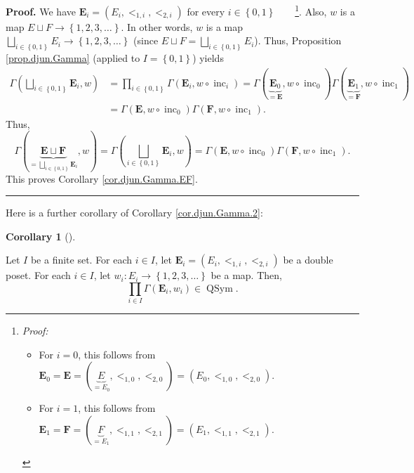 \documentclass[numbers=enddot,12pt,final,onecolumn,notitlepage,abstracton]{scrartcl}
\theoremstyle{definition}
\newtheorem{coro}[theo]{Corollary}
\newenvironment{corollary}[1][]
{\begin{coro}[#1]\begin{leftbar}}
{\end{leftbar}\end{coro}}
\newenvironment{proof}[1][Proof]{\noindent\textbf{#1.} }{\ \rule{0.5em}{0.5em}}
\let\prodnonlimits\prod
\renewcommand{\prod}{\prodnonlimits\limits}
\newenvironment{verlong}{}{}
\begin{document}
\begin{verlong}
\begin{footnotesize}
\begin{proof}
We have $\mathbf{E}_{i}=\left(  E_{i},<_{1,i},<_{2,i}\right)  $ for every
$i\in\left\{  0,1\right\}  $\ \ \ \ \footnote{\textit{Proof:}
\par
\begin{itemize}
\item For $i=0$, this follows from $\mathbf{E}_{0}=\mathbf{E}=\left(
\underbrace{E}_{=E_{0}},<_{1,0},<_{2,0}\right)  =\left(  E_{0},<_{1,0}%
,<_{2,0}\right)  $.
\par
\item For $i=1$, this follows from $\mathbf{E}_{1}=\mathbf{F}=\left(
\underbrace{F}_{=E_{1}},<_{1,1},<_{2,1}\right)  =\left(  E_{1},<_{1,1}%
,<_{2,1}\right)  $.
\end{itemize}
}. Also, $w$ is a map $E\sqcup F\rightarrow\left\{  1,2,3,\ldots\right\}  $.
In other words, $w$ is a map $\bigsqcup_{i\in\left\{  0,1\right\}  }%
E_{i}\rightarrow\left\{  1,2,3,\ldots\right\}  $ (since $E\sqcup
F=\bigsqcup_{i\in\left\{  0,1\right\}  }E_{i}$). Thus, Proposition
\ref{prop.djun.Gamma} (applied to $I=\left\{  0,1\right\}  $) yields%
\begin{align*}
\Gamma\left(  \bigsqcup_{i\in\left\{  0,1\right\}  }\mathbf{E}_{i},w\right)
&  =\prod_{i\in\left\{  0,1\right\}  }\Gamma\left(  \mathbf{E}_{i}%
,w\circ\operatorname*{inc}\nolimits_{i}\right)  =\Gamma\left(
\underbrace{\mathbf{E}_{0}}_{=\mathbf{E}},w\circ\operatorname*{inc}%
\nolimits_{0}\right)  \Gamma\left(  \underbrace{\mathbf{E}_{1}}_{=\mathbf{F}%
},w\circ\operatorname*{inc}\nolimits_{1}\right) \\
&  =\Gamma\left(  \mathbf{E},w\circ\operatorname*{inc}\nolimits_{0}\right)
\Gamma\left(  \mathbf{F},w\circ\operatorname*{inc}\nolimits_{1}\right)  .
\end{align*}
Thus,%
\[
\Gamma\left(  \underbrace{\mathbf{E}\sqcup\mathbf{F}}_{=\bigsqcup
_{i\in\left\{  0,1\right\}  }\mathbf{E}_{i}},w\right)  =\Gamma\left(
\bigsqcup_{i\in\left\{  0,1\right\}  }\mathbf{E}_{i},w\right)  =\Gamma\left(
\mathbf{E},w\circ\operatorname*{inc}\nolimits_{0}\right)  \Gamma\left(
\mathbf{F},w\circ\operatorname*{inc}\nolimits_{1}\right)  .
\]
This proves Corollary \ref{cor.djun.Gamma.EF}.
\end{proof}

Here is a further corollary of Corollary \ref{cor.djun.Gamma.2}:

\begin{corollary}
\label{cor.djun.Gamma.2.cor}Let $I$ be a finite set. For each $i\in I$, let
$\mathbf{E}_{i}=\left(  E_{i},<_{1,i},<_{2,i}\right)  $ be a double poset. For
each $i\in I$, let $w_{i}:E_{i}\rightarrow\left\{  1,2,3,\ldots\right\}  $ be
a map. Then,%
\[
\prod_{i\in I}\Gamma\left(  \mathbf{E}_{i},w_{i}\right)  \in
\operatorname*{QSym}.
\]


\end{corollary}
\end{footnotesize}
\end{verlong}
\end{document}
